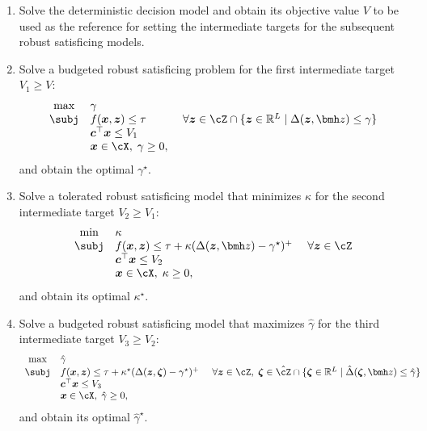 \documentclass[mnsc, nonblindrev]{informswp}
\newcommand{\1}[1]{\mathds{1}{\left(#1\right)}}
\begin{document}
\begin{enumerate}[Step 1.]\addtocounter{enumi}{-1}
\item Solve the deterministic decision model and obtain its objective value $V$ to be used as the reference for setting the intermediate targets for the subsequent robust satisficing models.

\item Solve a budgeted robust satisficing problem for the first intermediate target $V_{1}\geq V$:
\[
\begin{array}{cll}
\max & \gamma  \\
\subj & f(\bm x,\bm z) \leq \tau &~\forall \bm z \in \cZ \cap \{\bm z \in \mathbb{R}^L \;|\; \Delta(\bm z,\bmh z) \leq \gamma\} \\
& \bm c^\top \bm x \leq V_{1} \\
& \bm x \in \cX, \; \gamma \geq 0,
\end{array}
\]
and obtain the optimal $\gamma^\star$. 

\item Solve a tolerated robust satisficing model that minimizes $\kappa$ for the second intermediate target $V_{2} \geq V_{1}$: 
\[
\begin{array}{cll} 
\min & \kappa   \\
{\subj} & f(\bm x,\bm z) \leq \tau +  \kappa (\Delta(\bm z,\bmh z) - \gamma^\star)^+ &~\forall \bm z \in \cZ \\
& \bm c^\top \bm x \leq V_{2} \\
& \bm x \in \cX, \; \kappa \geq 0,
\end{array}
\]
and obtain its optimal $\kappa^\star$.

\item Solve a budgeted robust satisficing model that maximizes $\hat \gamma$ for the third intermediate target $V_{3}\geq V_{2}$: 
\[
\begin{array}{cll} 
\max & \hat \gamma \\
{\subj} & f(\bm x,\bm z) \leq \tau +  \kappa^\star (\Delta(\bm z,\bm \zeta) - \gamma^\star)^+ &~\forall \bm z \in \cZ, \; \bm \zeta \in \hat \cZ \cap \{\bm \zeta \in \mathbb{R}^L \;|\; \hat \Delta(\bm \zeta,\bmh z) \leq \hat \gamma \} \\
& \bm c^\top \bm x \leq V_{3} \\
& \bm x \in  \cX, \; \hat \gamma \geq 0,
\end{array}
\]
and obtain its optimal $\hat \gamma^\star$. 


\end{enumerate}
\end{document}
